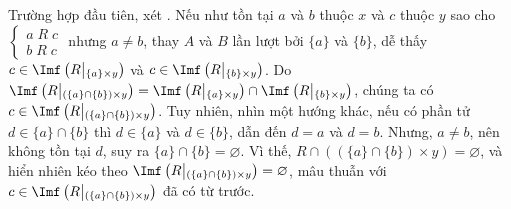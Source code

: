 Trường hợp đầu tiên, xét . Nếu như tồn tại $a$ và $b$ thuộc $x$ và $c$ thuộc $y$ sao cho $\begin{cases}
   a\;R\;c \\
   b\;R\;c
\end{cases}$ nhưng $a \neq b$, thay $A$ và $B$ lần lượt bởi $\{a\}$ và $\{b\}$, dễ thấy $c \in \Imf\left(R\middle|_{\{a\} \times y}\right)$ và $c \in \Imf\left(R\middle|_{\{b\} \times y}\right)$. Do $\Imf\left(R\middle|_{(\{a\} \cap \{b\}) \times y}\right) = \Imf\left(R\middle|_{\{a\} \times y}\right) \cap \Imf\left(R\middle|_{\{b\} \times y}\right)$, chúng ta có $c \in \Imf\left(R\middle|_{(\{a\} \cap \{b\}) \times y}\right)$. Tuy nhiên, nhìn một hướng khác, nếu có phần tử $d \in \{a\} \cap \{b\}$ thì $d \in \{a\}$ và $d \in \{b\}$, dẫn đến $d = a$ và $d = b$. Nhưng, $a \neq b$, nên không tồn tại $d$, suy ra $\{a\} \cap \{b\} = \varnothing$. Vì thế, $R \cap ((\{a\} \cap \{b\}) \times y) = \varnothing$, và hiển nhiên kéo theo $\Imf\left(R\middle|_{(\{a\} \cap \{b\}) \times y}\right) = \varnothing$, mâu thuẫn với $c \in \Imf\left(R\middle|_{(\{a\} \cap \{b\}) \times y}\right)$ đã có từ trước.

